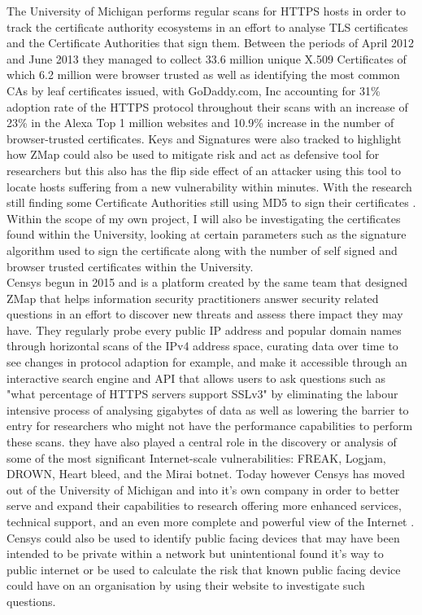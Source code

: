 \documentclass[a4wide,leqno,12pt]{report}
\begin{document}
The University of Michigan performs regular scans for HTTPS hosts\cite{durumeric2014internet} in order to track the certificate authority ecosystems in an effort to analyse TLS certificates and the Certificate Authorities that sign them. Between the periods of April 2012 and June 2013 they managed to collect 33.6 million unique X.509 Certificates of which 6.2 million were browser trusted as well as identifying the most common CAs by leaf certificates issued, with GoDaddy.com, Inc accounting for 31\% adoption rate of the HTTPS protocol throughout their scans with an increase of 23\% in the Alexa Top 1 million websites and  10.9\% increase in the number of browser-trusted certificates. Keys and Signatures were also tracked to highlight how ZMap could also be used to mitigate risk and act as defensive tool for researchers but this also has the flip side effect of an attacker using this tool to locate hosts suffering from a new vulnerability within minutes.\cite{durumeric2013zmap}  With the research still finding some Certificate Authorities still using MD5 to sign their certificates \cite{durumeric2013analysis}. Within the scope of my own project, I will also be investigating the certificates found within the University, looking at certain parameters such as the signature algorithm used to sign the certificate along with the number of self signed and browser trusted certificates within the University.  \\


Censys begun in 2015 and is a platform created by the same team that designed ZMap that helps information security practitioners answer security related questions in an effort to discover new threats and assess there impact they may have. They regularly probe every public IP address and popular domain names through horizontal scans of the IPv4 address space, curating data over time to see changes in protocol adaption for example, and make it accessible through an interactive search engine and API that allows users to ask questions such as "what percentage of HTTPS servers support SSLv3" by eliminating the labour intensive process of analysing gigabytes of data as well as lowering the barrier to entry for researchers who might not have the performance capabilities to perform these scans.\cite{durumeric2015search} they have also played a central role in the discovery or analysis of some of the most significant Internet-scale vulnerabilities: FREAK, Logjam, DROWN, Heart bleed, and the Mirai botnet. Today however Censys has moved out of the University of Michigan and into it's own company in order to better serve and expand their capabilities to research offering more enhanced services, technical support, and an even more complete and powerful view of the Internet \cite{censysWeb}.
Censys could also be used to identify public facing devices that may have been intended to be private within a network but unintentional found it's way to public internet or be used to calculate the risk that known public facing device could have on an organisation \cite{durumeric2015search} by using their website to investigate such questions.\\
\end{document}
